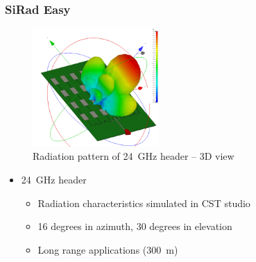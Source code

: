 \documentclass[aspectratio=43]{beamer}
\begin{document}
\begin{frame}[fragile]
  \frametitle{SiRad Easy}

  \begin{figure}[h!]
    \centering
    \includegraphics[width=0.43\textwidth]{../img/farfield3d.png}
    \caption{Radiation pattern of 24~GHz header -- 3D view}
    \label{fig:farfield3d}
  \end{figure}

  \begin{itemize}
    \item 24~GHz header
      \begin{itemize}
        \item Radiation characteristics simulated in CST studio
        \item 16 degrees in azimuth, 30 degrees in elevation
				\item Long range applications (300~m)
      \end{itemize}
  \end{itemize}
\end{frame}
\end{document}
